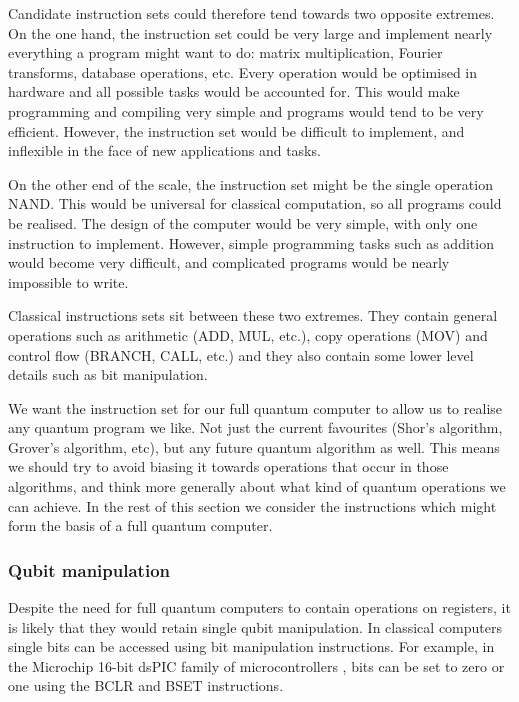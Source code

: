 Candidate instruction sets could therefore tend towards two opposite extremes. On the one hand, the instruction set could be very large and implement nearly everything a program might want to do: matrix multiplication, Fourier transforms, database operations, etc. Every operation would be optimised in hardware and all possible tasks would be accounted for. This would make programming and compiling very simple and programs would tend to be very efficient. However, the instruction set would be difficult to implement, and inflexible in the face of new applications and tasks.

On the other end of the scale, the instruction set might be the single operation NAND. This would be universal for classical computation, so all programs could be realised. The design of the computer would be very simple, with only one instruction to implement. However, simple programming tasks such as addition would become very difficult, and complicated programs would be nearly impossible to write.

Classical instructions sets sit between these two extremes. They contain general operations such as arithmetic (ADD, MUL, etc.), copy operations (MOV) and control flow (BRANCH, CALL, etc.) and they also contain some lower level details such as bit manipulation. 

We want the instruction set for our full quantum computer to allow us to realise any quantum program we like. Not just the current favourites (Shor's algorithm, Grover's algorithm, etc), but any future quantum algorithm as well. This means we should try to avoid biasing it towards operations that occur in those algorithms, and think more generally about what kind of quantum operations we can achieve. In the rest of this section we consider the instructions which might form the basis of a full quantum computer. 


\subsubsection{Qubit manipulation}

Despite the need for full quantum computers to contain operations on registers, it is likely that they would retain single qubit manipulation. In classical computers single bits can be accessed using bit manipulation instructions.  For example, in the Microchip 16-bit dsPIC family of microcontrollers \cite{microchip2008AsmRef}, bits can be set to zero or one using the BCLR and BSET instructions.

